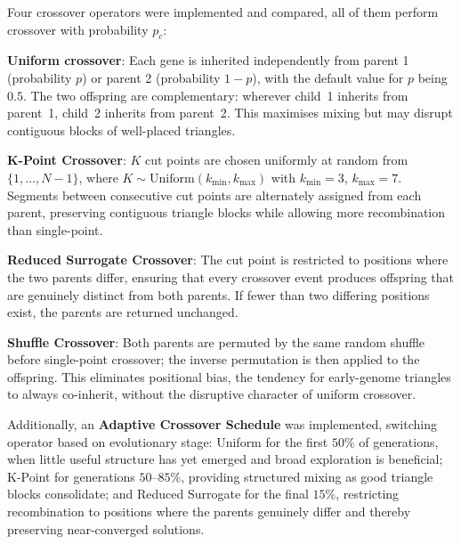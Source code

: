 \documentclass[11pt,a4paper]{article}
\begin{document}
Four crossover operators were implemented and compared, all of them perform crossover with probability $p_{c}$:

\vspace{0.2cm}

\textbf{Uniform crossover}: Each gene is inherited independently from parent 1 (probability $p$) or parent 2 (probability $1-p$), with the default value for $p$ being $0.5$. The two
offspring are complementary: wherever child~1 inherits from parent~1, child~2
inherits from parent~2. This maximises mixing but may disrupt contiguous
blocks of well-placed triangles.

\vspace{0.2cm}

\textbf{K-Point Crossover}: $K$ cut points are chosen uniformly at random
from $\{1,\ldots,N-1\}$, where $K\sim\mathrm{Uniform}(k_{\min},k_{\max})$
with $k_{\min}=3$, $k_{\max}=7$. Segments between consecutive cut points are
alternately assigned from each parent, preserving contiguous triangle blocks
while allowing more recombination than single-point.
\vspace{0.2cm}

\textbf{Reduced Surrogate Crossover}: The cut point is restricted to
positions where the two parents differ, ensuring that every crossover event
produces offspring that are genuinely distinct from both parents. If fewer
than two differing positions exist, the parents are returned unchanged.

\vspace{0.2cm}

\textbf{Shuffle Crossover}: Both parents are permuted by the same random
shuffle before single-point crossover; the inverse permutation is then applied
to the offspring. This eliminates positional bias, the tendency for
early-genome triangles to always co-inherit, without the disruptive character
of uniform crossover.

\vspace{0.2cm}
Additionally, an \textbf{Adaptive Crossover Schedule} was implemented,
switching operator based on evolutionary stage: Uniform for the first $50\%$
of generations, when little useful structure has yet emerged and broad
exploration is beneficial; K-Point for generations $50$--$85\%$, providing
structured mixing as good triangle blocks consolidate; and Reduced Surrogate
for the final $15\%$, restricting recombination to positions where the parents
genuinely differ and thereby preserving near-converged solutions.
\end{document}
